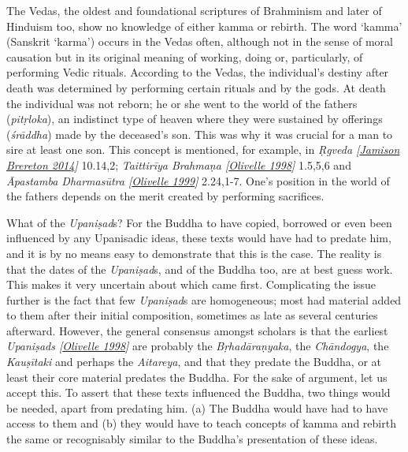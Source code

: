 The Vedas, the oldest and foundational scriptures of Brahminism and
later of Hinduism too, show no knowledge of either kamma or rebirth. The
word `kamma' (Sanskrit `karma') occurs in the Vedas often, although not
in the sense of moral causation but in its original meaning of working,
doing or, particularly, of performing Vedic rituals. According to the
Vedas, the individual's destiny after death was determined by performing
certain rituals and by the gods. At death the individual was not reborn;
he or she went to the world of the fathers (\emph{pitṛloka}), an
indistinct type of heaven where they were sustained by offerings
(\emph{śrāddha}) made by the deceased's son. This was why it was crucial
for a man to sire at least one son. This concept is mentioned, for
example, in \emph{{Ṛgveda
{{[}\hyperref[footprints_split_022.htmlux5cux23Jamisonux5cux2520Breretonux5cux25202014]{Jamison
Brereton 2014}{]}}}} 10.14,2; \emph{{Taittirīya Brahmaṇa
{{[}\hyperref[footprints_split_022.htmlux5cux23Olivelleux5cux25201998]{Olivelle
1998}{]}}}} 1.5,5,6 and \emph{{Āpastamba Dharmasūtra
{{[}\hyperref[footprints_split_022.htmlux5cux23Olivelleux5cux25201999]{Olivelle
1999}{]}}}} 2.24,1-7. One's position in the world of the fathers depends
on the merit created by performing sacrifices.

What of the \emph{Upaniṣad}s? For the Buddha to have copied, borrowed or
even been influenced by any Upanisadic ideas, these texts would have had
to predate him, and it is by no means easy to demonstrate that this is
the case. The reality is that the dates of the \emph{Upaniṣad}s, and of
the Buddha too, are at best guess work. This makes it very uncertain
about which came first. Complicating the issue further is the fact that
few \emph{Upaniṣad}s are homogeneous; most had material added to them
after their initial composition, sometimes as late as several centuries
afterward. However, the general consensus amongst scholars is that the
earliest \emph{{Upaniṣads
{{[}\hyperref[footprints_split_022.htmlux5cux23Olivelleux5cux25201998]{Olivelle
1998}{]}}}} are probably the \emph{Bṛhadāraṇyaka}, the \emph{Chāndogya},
the \emph{Kauṣītaki} and perhaps the \emph{Aitareya}, and that they
predate the Buddha, or at least their core material predates the Buddha.
For the sake of argument, let us accept this. To assert that these texts
influenced the Buddha, two things would be needed, apart from predating
him. (a) The Buddha would have had to have access to them and (b) they
would have to teach concepts of kamma and rebirth the same or
recognisably similar to the Buddha's presentation of these ideas.

